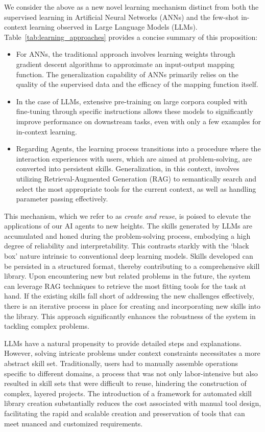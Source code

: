 We consider the above as a new novel learning mechanism distinct from both the supervised learning in Artificial Neural Networks (ANNs) and the few-shot in-context learning observed in Large Language Models (LLMs). Table~\ref{tab:learning_approaches} provides a concise summary of this proposition:

\begin{itemize}
    \item For ANNs, the traditional approach involves learning weights through gradient descent algorithms to approximate an input-output mapping function. The generalization capability of ANNs primarily relies on the quality of the supervised data and the efficacy of the mapping function itself.
    \item In the case of LLMs, extensive pre-training on large corpora coupled with fine-tuning through specific instructions allows these models to significantly improve performance on downstream tasks, even with only a few examples for in-context learning.
    \item Regarding Agents, the learning process transitions into a procedure where the interaction experiences with users, which are aimed at problem-solving, are converted into persistent skills. Generalization, in this context, involves utilizing Retrieval-Augmented Generation (RAG) to semantically search and select the most appropriate tools for the current context, as well as handling parameter passing effectively.
\end{itemize}

This mechanism, which we refer to as \textit{create and reuse}, is poised to elevate the applications of our AI agents to new heights. The skills generated by LLMs are accumulated and honed during the problem-solving process, embodying a high degree of reliability and interpretability. This contrasts starkly with the ‘black box’ nature intrinsic to conventional deep learning models. Skills developed can be persisted in a structured format, thereby contributing to a comprehensive skill library. Upon encountering new but related problems in the future, the system can leverage RAG techniques to retrieve the most fitting tools for the task at hand. If the existing skills fall short of addressing the new challenges effectively, there is an iterative process in place for creating and incorporating new skills into the library. This approach significantly enhances the robustness of the system in tackling complex problems.

LLMs have a natural propensity to provide detailed steps and explanations. However, solving intricate problems under context constraints necessitates a more abstract skill set. Traditionally, users had to manually assemble operations specific to different domains, a process that was not only labor-intensive but also resulted in skill sets that were difficult to reuse, hindering the construction of complex, layered projects. The introduction of a framework for automated skill library creation substantially reduces the cost associated with manual tool design, facilitating the rapid and scalable creation and preservation of tools that can meet nuanced and customized requirements.


